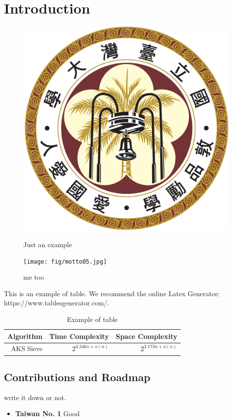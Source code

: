 \chapter{Introduction}


\begin{figure}
    \hfil
    \begin{minipage}[t]{0.3\textwidth}
        \includegraphics[width=\textwidth]{fig/Emblem72.jpg}
        \caption{\label{fig:parallel1} Just an example}
    \end{minipage}
    \hfil
    \begin{minipage}[t]{0.4\textwidth}
        \texttt{[image: fig/motto05.jpg]}
        \caption{\label{fig:parallel2}me too}
    \end{minipage}
    \hfil
\end{figure}




This is an example of table.
We recommend the online Latex Generator: https://www.tablesgenerator.com/.

\begin{table}[h]
    \centering
    \begin{tabular}{|r r r|}
        \hline
        Algorithm  & Time Complexity & Space Complexity \\ \hline
        AKS    Sieve       \cite{DBLP:conf/stoc/AjtaiKS01}               & $2^{3.346n+o(n)}$       & $2^{2.173n+o(n)}$        \\ \hline    
    \end{tabular}
    \caption{Example of table}
    \label{table:example}
\end{table}



\section{Contributions and Roadmap}
write it down or not.
\begin{itemize}
    \item {\bf Taiwan No. 1}
    Good
\end{itemize}



